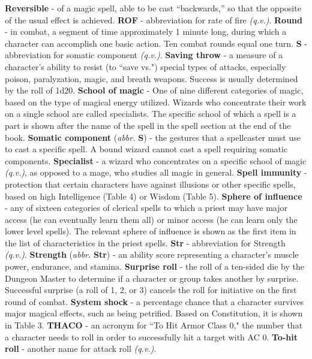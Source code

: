 \documentclass[../main.tex]{subfiles}
\begin{document}
\begin{multicols}{3}
\textbf{Reversible} - of a magic spell, able to be cast “backwards,” so that the opposite of the usual effect is achieved.
\textbf{ROF} - abbreviation for rate of fire \textit{(q.v.)}.
\textbf{Round} - in combat, a segment of time approximately 1 minute long, during which a character can accomplish one basic action. Ten combat rounds equal one turn.
\textbf{S} - abbreviation for somatic component \textit{(q.v.)}.
\textbf{Saving throw} - a measure of a character's ability to resist (to “save vs.") special types of attacks, especially poison, paralyzation, magic, and breath weapons. Success is usually determined by the roll of 1d20.
\textbf{School of magic} - One of nine different categories of magic, based on the type of magical energy utilized. Wizards who concentrate their work on a single school are called specialists. The specific school of which a spell is a part is shown after the name of the spell in the spell section at the end of the book.
\textbf{Somatic component} (\textit{abbr.} \textbf{S}) - the gestures that a spellcaster must use to cast a specific spell. A bound wizard cannot cast a spell requiring somatic components.
\textbf{Specialist} - a wizard who concentrates on a specific school of magic \textit{(q.v.)}, as opposed to a mage, who studies all magic in general.
\textbf{Spell immunity} - protection that certain characters have against illusions or other specific spells, based on high Intelligence (Table 4) or Wisdom (Table 5).
\textbf{Sphere of influence} - any of sixteen categories of clerical spells to which a priest may have major access (he can eventually learn them all) or minor access (he can learn only the lower level spells). The relevant sphere of influence is shown as the first item in the list of characteristics in the priest spells.
\textbf{Str} - abbreviation for Strength \textit{(q.v.)}.
\textbf{Strength} (\textit{abbr.} \textbf{Str}) - an ability score representing a character's muscle power, endurance, and stamina.
\textbf{Surprise roll} - the roll of a ten-sided die by the Dungeon Master to determine if a character or group takes another by surprise. Successful surprise (a roll of 1, 2, or 3) cancels the roll for initiative on the first round of combat.
\textbf{System shock} - a percentage chance that a character survives major magical effects, such as being petrified. Based on Constitution, it is shown in Table 3.
\textbf{THACO} - an acronym for “To Hit Armor Class 0," the number that a character needs to roll in order to successfully hit a target with AC 0.
\textbf{To-hit roll} - another name for attack roll \textit{(q.v.)}.

\end{multicols}
\end{document}
